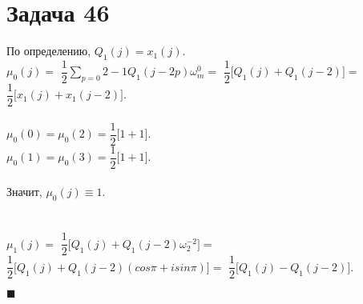 \documentclass{article}
\newcommand\proofend{\begin{flushright}$\blacksquare$\end{flushright}}
\begin{document}
{\section*{Задача 46}
По определению, $Q_1(j) = x_1(j)$.\\
$\mu_0(j) = $
$\dfrac{1}{2} \sum\limits_{p=0}{2-1} Q_1(j - 2p) \omega_m^0 =$
$\dfrac{1}{2} \big [ Q_1(j) + Q_1(j - 2) \big ] = $
$\dfrac{1}{2} \big [ x_1(j) + x_1(j - 2) \big ]$. \\ \\
$\mu_0(0) = \mu_0(2) = \dfrac{1}{2} \big [ 1 + 1 \big ]$. \\
$\mu_0(1) = \mu_0(3) = \dfrac{1}{2} \big [ 1 + 1 \big ]$. \\ \\
Значит, $\mu_0(j) \equiv 1$. \\ \\ \\
$\mu_1(j) = $
$\dfrac{1}{2} \big [ Q_1(j) + Q_1(j - 2) \omega_2^{-2} \big ] = $
$\dfrac{1}{2} \big [ Q_1(j) + Q_1(j - 2) (cos \pi + isin\pi) \big ] = $
$\dfrac{1}{2} \big [ Q_1(j) - Q_1(j - 2) \big ].$
\proofend
}
\end{document}
